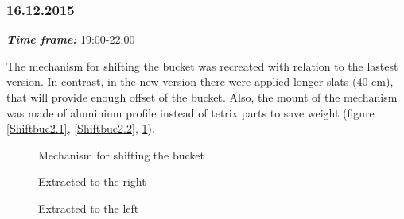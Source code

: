 \subsubsection{16.12.2015}
\textit{\textbf{Time frame:}} 19:00-22:00 

The mechanism for shifting the bucket was recreated with relation to the lastest version. In contrast, in the new version there were applied longer slats (40 cm), that will provide enough offset of the bucket. Also, the mount of the mechanism was made of aluminium profile instead of tetrix parts to save weight (figure \ref{Shiftbuc2.1}, \ref{Shiftbuc2.2}, \ref{Shiftbuc2.3}).

\begin{figure}[H]
	\begin{minipage}[h]{0.47\linewidth}
		\caption{Mechanism for shifting the bucket}
		\label{Shiftbuc2.1}
	\end{minipage}
	\hfill
	\begin{minipage}[h]{0.47\linewidth}
		\caption{Extracted to the right}
		\label{Shiftbuc2.2}
	\end{minipage}
	\hfill
	\begin{minipage}[h]{1\linewidth}
		\caption{Extracted to the left}
		\label{Shiftbuc2.3}
	\end{minipage}
\end{figure}
